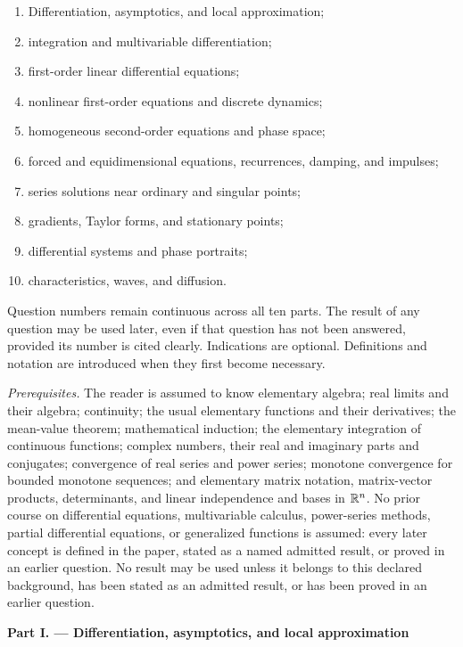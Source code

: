 \documentclass[10pt,a4paper]{article}
\newcommand{\exampart}[2]{%
  \clearpage
  \markboth{Part #1}{}
  \begin{center}
    {\large\bfseries Part #1. --- #2}
  \end{center}
}
\begin{document}
\begin{enumerate}[label=\Roman*.,leftmargin=3.1em,itemsep=1pt]
  \item Differentiation, asymptotics, and local approximation;
  \item integration and multivariable differentiation;
  \item first-order linear differential equations;
  \item nonlinear first-order equations and discrete dynamics;
  \item homogeneous second-order equations and phase space;
  \item forced and equidimensional equations, recurrences, damping, and
  impulses;
  \item series solutions near ordinary and singular points;
  \item gradients, Taylor forms, and stationary points;
  \item differential systems and phase portraits;
  \item characteristics, waves, and diffusion.
\end{enumerate}

Question numbers remain continuous across all ten parts.  The result of any
question may be used later, even if that question has not
been answered, provided its number is cited clearly.  Indications are
optional.  Definitions and notation are introduced when they first become
necessary.

\emph{Prerequisites.}  The reader is assumed to know elementary algebra;
real limits and their algebra; continuity; the usual elementary functions and
their derivatives; the mean-value theorem; mathematical induction; the
elementary integration of continuous functions; complex numbers, their real
and imaginary parts and conjugates; convergence of real series and power
series; monotone convergence for bounded monotone sequences; and elementary
matrix notation, matrix-vector products, determinants, and linear
independence and bases in $\mathbb{R}^n$.  No prior course on
differential equations, multivariable calculus, power-series methods,
partial differential equations, or generalized functions is assumed: every
later concept is defined in the paper, stated as a named admitted result, or
proved in an earlier question.  No result may be used unless it belongs to
this declared background, has been stated as an admitted result, or has been
proved in an earlier question.

\exampart{I}{Differentiation, asymptotics, and local approximation}
\end{document}
